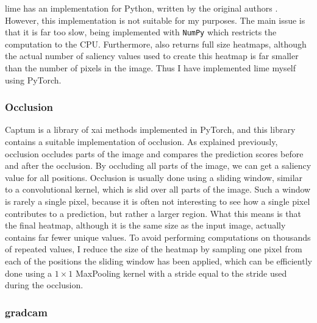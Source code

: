 \documentclass[UKenglish]{uiomasterthesis} %
\theoremstyle{definition}
\begin{document}
\ac{lime} has an implementation for Python, written by the original authors \cite{lime}. However, this implementation is not suitable for my purposes. The main issue is that it is far too slow, being implemented with \texttt{NumPy} which restricts the computation to the CPU. Furthermore, \cite{lime} also returns full size heatmaps, although the actual number of saliency values used to create this heatmap is far smaller than the number of pixels in the image. Thus I have implemented \ac{lime} myself using PyTorch.

\subsubsection{Occlusion}

Captum \cite{captum} is a library of \ac{xai} methods implemented in PyTorch, and this library contains a suitable implementation of occlusion. As explained previously, occlusion occludes parts of the image and compares the prediction scores before and after the occlusion. By occluding all parts of the image, we can get a saliency value for all positions. Occlusion is usually done using a sliding window, similar to a convolutional kernel, which is slid over all parts of the image. Such a window is rarely a single pixel, because it is often not interesting to see how a single pixel contributes to a prediction, but rather a larger region. What this means is that the final heatmap, although it is the same size as the input image, actually contains far fewer unique values. To avoid performing computations on thousands of repeated values, I reduce the size of the heatmap by sampling one pixel from each of the positions the sliding window has been applied, which can be efficiently done using a $1 \times 1$ MaxPooling kernel with a stride equal to the stride used during the occlusion.

\subsubsection{\ac{gradcam}}
\end{document}
